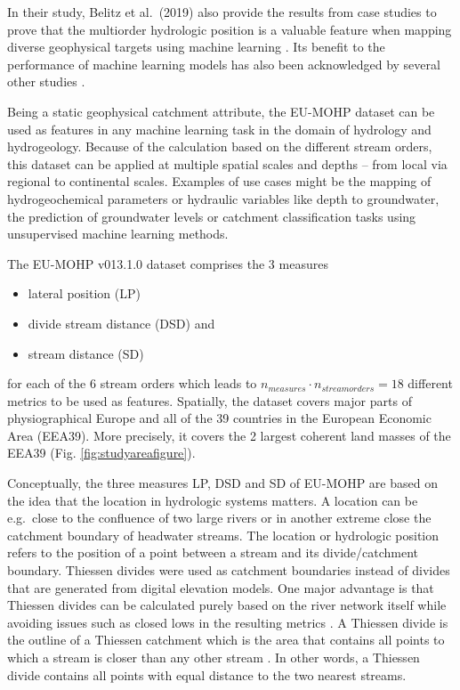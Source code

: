 \documentclass[fleqn,10pt]{wlscirep}
\providecommand{\tightlist}{%
  \setlength{\itemsep}{0pt}\setlength{\parskip}{0pt}}
\begin{document}
In their study, Belitz et al.~(2019) also provide the results from case studies to prove that the multiorder hydrologic position is a valuable feature when mapping diverse geophysical targets using machine learning \cite{belitz_multiorder_2019}. Its benefit to the performance of machine learning models has also been acknowledged by several other studies \cite{degnan_relation_2020, knierim_using_2020, stackelberg_machine_2021}.

Being a static geophysical catchment attribute, the EU-MOHP dataset can be used as features in any machine learning task in the domain of hydrology and hydrogeology. Because of the calculation based on the different stream orders, this dataset can be applied at multiple spatial scales and depths -- from local via regional to continental scales. Examples of use cases might be the mapping of hydrogeochemical parameters or hydraulic variables like depth to groundwater, the prediction of groundwater levels or catchment classification tasks using unsupervised machine learning methods.

The EU-MOHP v013.1.0 dataset comprises the 3 measures

\begin{itemize}
\tightlist
\item
  lateral position (LP)
\item
  divide stream distance (DSD) and
\item
  stream distance (SD)
\end{itemize}

for each of the 6 stream orders which leads to \(n_{measures}\cdot n_{streamorders} = 18\) different metrics to be used as features. Spatially, the dataset covers major parts of physiographical Europe and all of the 39 countries in the European Economic Area (EEA39). More precisely, it covers the 2 largest coherent land masses of the EEA39 (Fig. \ref{fig:studyareafigure}).

Conceptually, the three measures LP, DSD and SD of EU-MOHP are based on the idea that the location in hydrologic systems matters. A location can be e.g.~close to the confluence of two large rivers or in another extreme close the catchment boundary of headwater streams. The location or hydrologic position refers to the position of a point between a stream and its divide/catchment boundary. Thiessen divides were used as catchment boundaries instead of divides that are generated from digital elevation models. One major advantage is that Thiessen divides can be calculated purely based on the river network itself while avoiding issues such as closed lows in the resulting metrics \cite{belitz_multiorder_2019}. A Thiessen divide is the outline of a Thiessen catchment which is the area that contains all points to which a stream is closer than any other stream \cite{johnston_evaluation_2009}. In other words, a Thiessen divide contains all points with equal distance to the two nearest streams.
\end{document}
